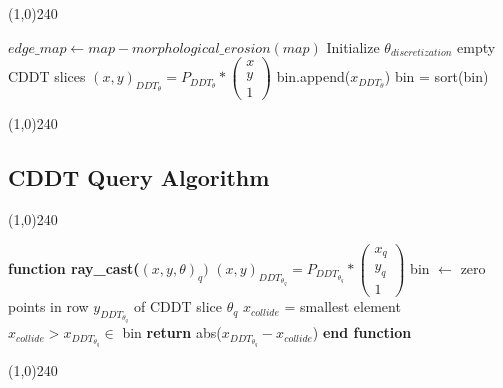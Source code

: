 \documentclass[letterpaper, 10 pt, conference]{ieeeconf}  %
\newcommand{\INDSTATE}[1][1]{\STATE\hspace{#1\algorithmicindent}}
\begin{document}
\begin{center}
\line(1,0){240}
\end{center}
\begin{algorithmic}
\STATE $edge\_map\gets map-morphological\_erosion(map)$
\STATE Initialize $\theta_{discretization}$ empty CDDT slices
\FOR {$\theta \in \{\lfloor\theta\rceil\}$} 
            \STATE $(x,y)_{DDT_{\theta}} = P_{DDT_{\theta}}*\begin{pmatrix}
                        x \\
                        y \\
                        1
             \end{pmatrix}$
                \STATE bin.append($x_{DDT_{\theta}}$)
             \ENDFOR
        \ENDFOR
            \STATE bin = sort(bin)
        \ENDFOR
\ENDFOR
\end{algorithmic}
\begin{center}
\line(1,0){240}
\end{center}

\subsection{CDDT Query Algorithm}

\begin{center}
\line(1,0){240}
\end{center}
\begin{algorithmic}
\STATE \textbf{function ray\_cast($(x,y,\theta)_{q})$}
\INDSTATE[1] $(x,y)_{DDT_{\theta_{q}}} = P_{DDT_{\theta_{q}}}*\begin{pmatrix}
                        x_{q} \\
                        y_{q} \\
                        1
             \end{pmatrix}$
\INDSTATE[1] bin $\gets$ zero points in row $y_{DDT_{\theta_{q}}}$ of CDDT slice $\theta_{q}$
\INDSTATE[1] $x_{collide}$ = smallest element $x_{collide} > x_{DDT_{\theta_q}}\in$ bin
\INDSTATE[1] \textbf{return} abs($x_{DDT_{\theta_q}} - x_{collide}$)
\STATE \textbf{end function}\end{algorithmic}
\begin{center}
\line(1,0){240}
\end{center}
\end{document}
